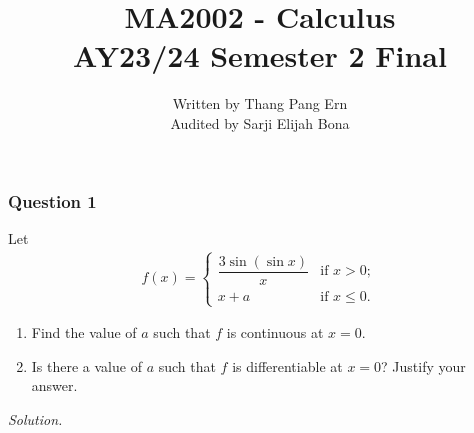 \documentclass[12pt]{article}
\title{MA2002 - Calculus \\ AY23/24 Semester 2 Final}
\author{Written by Thang Pang Ern \\ Audited by Sarji Elijah Bona}
\begin{document}
\maketitle
\subsubsection*{Question 1}
Let \begin{align*}
    f(x)=\begin{cases}
        \dfrac{3\operatorname{sin}\left(\operatorname{sin}x\right)}{x} & \text{if }x>0;\\
        x+a & \text{if }x\le 0.
    \end{cases}
\end{align*}
\begin{enumerate}[label=\textbf{(\roman*)}]
    \itemsep 0em
    \item Find the value of $a$ such that $f$ is continuous at $x=0$.
    \item Is there a value of $a$ such that $f$ is differentiable at $x=0$? Justify your answer.
\end{enumerate}
\textit{Solution.}
\end{document}
